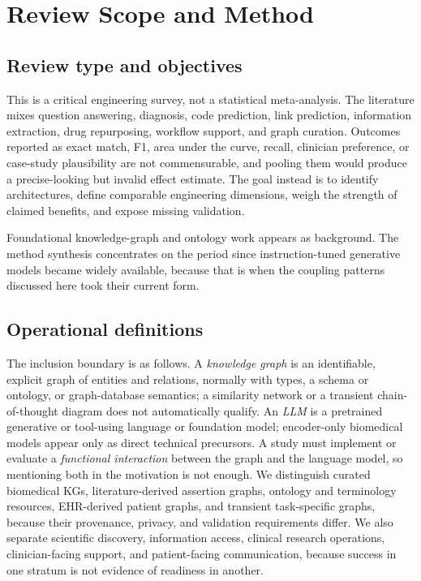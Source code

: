 \section{Review Scope and Method}


\subsection{Review type and objectives}

This is a critical engineering survey, not a statistical meta-analysis. The literature mixes question answering, diagnosis, code prediction, link prediction, information extraction, drug repurposing, workflow support, and graph curation. Outcomes reported as exact match, F1, area under the curve, recall, clinician preference, or case-study plausibility are not commensurable, and pooling them would produce a precise-looking but invalid effect estimate. The goal instead is to identify architectures, define comparable engineering dimensions, weigh the strength of claimed benefits, and expose missing validation.

Foundational knowledge-graph and ontology work appears as background. The method synthesis concentrates on the period since instruction-tuned generative models became widely available, because that is when the coupling patterns discussed here took their current form.

\subsection{Operational definitions}

The inclusion boundary is as follows. A \emph{knowledge graph} is an identifiable, explicit graph of entities and relations, normally with types, a schema or ontology, or graph-database semantics; a similarity network or a transient chain-of-thought diagram does not automatically qualify. An \emph{LLM} is a pretrained generative or tool-using language or foundation model; encoder-only biomedical models appear only as direct technical precursors. A study must implement or evaluate a \emph{functional interaction} between the graph and the language model, so mentioning both in the motivation is not enough. We distinguish curated biomedical KGs, literature-derived assertion graphs, ontology and terminology resources, EHR-derived patient graphs, and transient task-specific graphs, because their provenance, privacy, and validation requirements differ. We also separate scientific discovery, information access, clinical research operations, clinician-facing support, and patient-facing communication, because success in one stratum is not evidence of readiness in another.

